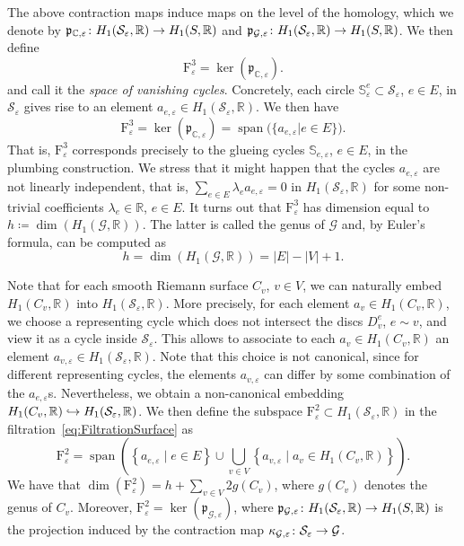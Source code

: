 \documentclass[AHL,Unicode,longabstracts]{cedram}
\DeclareMathOperator{\spann}{span}
\newcommand{\graphgenus}{{h}}
\newcommand{\filter}{\mathrm{F}}
\newcommand{\R}{\mathbb{R}}
\renewcommand{\S}{\mathbb{S}}
\newcommand{\smallcc}{\mathbb{C}}
\newcommand{\mgr}{\mathcal{G}}
\newcommand{\rsf}{\mathcal{S}}
\newcommand{\proj}{\mathfrak{p}}
\renewcommand*{\to}{\mathchoice{\longrightarrow}{\rightarrow}{\rightarrow}{\rightarrow}}
\newcommand{\longhookrightarrow}{\lhook\joinrel\longrightarrow}
\newcommand*{\hookto}{\mathchoice{\longhookrightarrow}{\hookrightarrow}{\hookrightarrow}{\hookrightarrow}}
\begin{document}
The above contraction maps induce maps on the level of the homology, which we denote by $\proj_{\smallcc, \varepsilon} \colon H_1(\rsf_\varepsilon, \R) \to H_1(S, \R)$ and $\proj_{\mgr, \varepsilon} \colon H_1(\rsf_\varepsilon, \R) \to H_1(S,\R)$. We then define
\[
\filter^3_\varepsilon = \ker(\proj_{\smallcc, \varepsilon}).
\]
and call it the \emph{space of vanishing cycles}. Concretely, each circle $\S^e_{\varepsilon} \subset \rsf_\varepsilon$, $e \in E$, in $\rsf_\varepsilon$ gives rise to an element $a_{e,\varepsilon} \in H_1(\rsf_\varepsilon, \R)$. We then have
\begin{equation}\label{eq:SurfaceF3}
\filter^3_\varepsilon = \ker(\proj_{\smallcc, \varepsilon}) =\spann \bigl(\{a_{e, \varepsilon}| e \in E \} \bigr).
\end{equation}
That is, $\filter^3_\varepsilon$ corresponds precisely to the glueing cycles $\S_{e, \varepsilon}$, $e \in E$, in the plumbing construction. We stress that it might happen that the cycles $a_{e, \varepsilon}$ are not linearly independent, that is, $\sum_{e \in E} \lambda_e a_{e,\varepsilon} = 0$ in $H_1(\rsf_\varepsilon, \R)$ for some non-trivial coefficients $\lambda_e \in \R$, $e \in E$. It turns out that $\filter^3_\varepsilon$ has dimension equal to $\graphgenus \coloneqq \dim(H_1(\mgr, \R))$. The latter is called the genus of $\mgr$ and, by Euler's formula, can be computed as
\[
\graphgenus = \dim(H_1(\mgr, \R)) = |E| - |V|+1.
\]


Note that for each smooth Riemann surface $C_v$, $v \in V$, we can naturally embed $H_1(C_v,\R)$ into $H_1(\rsf_\varepsilon,\R)$. More precisely, for each element $a_v \in H_1(C_v, \R)$, we choose a representing cycle which does not intersect the discs $D^e_v$, $e \sim v$, and view it as a cycle inside $\rsf_\varepsilon$. This allows to associate to each $a_v \in H_1(C_v, \R)$ an element $a_{v, \varepsilon} \in H_1(\rsf_\varepsilon,\R)$. Note that this choice is not canonical, since for different representing cycles, the elements $a_{v, \varepsilon}$ can differ by some combination of the $a_{e,\varepsilon}$s. Nevertheless, we obtain a non-canonical embedding $H_1(C_v, \R) \hookto H_1(\rsf_\varepsilon,\R)$. We then define the subspace $\filter^2_\varepsilon \subset H_1(\rsf_\varepsilon, \R)$ in the filtration~\eqref{eq:FiltrationSurface} as
\begin{equation}\label{eq:SurfaceF2}
\filter^2_\varepsilon =\spann\left(\left\{a_{e, \varepsilon}\mid e \in E \right\} \cup \bigcup_{v \in V} \left\{a_{v, \varepsilon}\mid a_v \in H_1(C_v, \R) \right\} \right).
\end{equation}
We have that $\dim(\filter^2_\varepsilon) = \graphgenus + \sum_{v \in V} 2g(C_v)$, where $g(C_v)$ denotes the genus of $C_v$. Moreover, $\filter^2_\varepsilon =\ker(\proj_{\mgr, \varepsilon}) $, where $\proj_{\mgr, \varepsilon} \colon H_1(\rsf_\varepsilon, \R) \to H_1(S,\R)$ is the projection induced by the contraction map $\kappa_{\mgr, \varepsilon} \colon \rsf_\varepsilon \to \mgr$.
\end{document}
